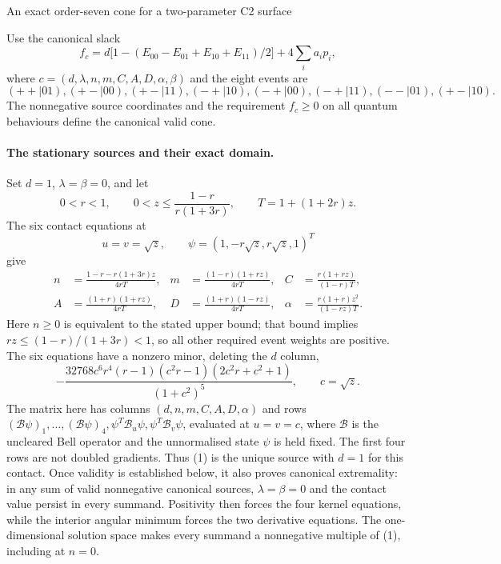\documentclass[11pt]{article}
\begin{document}
\begin{center}\large An exact order-seven cone for a two-parameter C2 surface\end{center}

Use the canonical slack
\[
 f_c=d\bigl[1-(E_{00}-E_{01}+E_{10}+E_{11})/2\bigr]
           +4\sum_i a_i p_i,
\]
where $c=(d,\lambda,n,m,C,A,D,\alpha,\beta)$ and the eight events are
\[
 (++|01),(+-|00),(+-|11),(-+|10),(-+|00),(-+|11),(--|01),(+-|10).
\]
The nonnegative source coordinates and the requirement $f_c\geq0$ on all
quantum behaviours define the canonical valid cone.

\paragraph{The stationary sources and their exact domain.}
Set $d=1$, $\lambda=\beta=0$, and let
\[
 0<r<1,\qquad 0<z\leq\frac{1-r}{r(1+3r)},\qquad
 T=1+(1+2r)z.
\]
The six contact equations at
\[
 u=v=\sqrt z,\qquad
 \psi=(1,-r\sqrt z,r\sqrt z,1)^T
\]
give
\begin{align*}
 n&=\frac{1-r-r(1+3r)z}{4rT},&
 m&=\frac{(1-r)(1+rz)}{4rT},&
 C&=\frac{r(1+rz)}{(1-r)T},\\
 A&=\frac{(1+r)(1+rz)}{4rT},&
 D&=\frac{(1+r)(1-rz)}{4rT},&
 \alpha&=\frac{r(1+r)z^2}{(1-rz)T}.
                                                               \tag{1}
\end{align*}
Here $n\geq0$ is equivalent to the stated upper bound; that bound implies
$rz\leq(1-r)/(1+3r)<1$, so all other required event weights are positive.
The six equations have a nonzero minor, deleting the $d$ column,
\[
 -\frac{32768c^6r^4(r-1)(c^2r-1)(2c^2r+c^2+1)}{(1+c^2)^5},
 \qquad c=\sqrt z.
\]
The matrix here has columns $(d,n,m,C,A,D,\alpha)$ and rows
$(\mathcal B\psi)_1,\ldots,(\mathcal B\psi)_4,
\psi^T\mathcal B_u\psi,\psi^T\mathcal B_v\psi$, evaluated at $u=v=c$,
where $\mathcal B$ is the uncleared Bell operator and the unnormalised
state $\psi$ is held fixed. The first four rows are not doubled gradients.
Thus (1) is the unique source with $d=1$ for this contact.
Once validity is established below, it also proves canonical extremality:
in any sum of valid nonnegative canonical sources, $\lambda=\beta=0$
and the contact value persist in every summand. Positivity then forces
the four kernel equations, while the interior angular minimum forces
the two derivative equations. The one-dimensional solution space makes
every summand a nonnegative multiple of (1), including at $n=0$.
\end{document}
